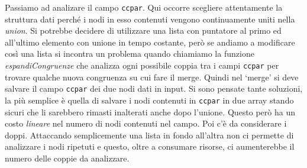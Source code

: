\documentclass[a4paper,11pt]{article} %
\newcommand{\campo}{\texttt}
\begin{document}
Passiamo ad analizare il campo \campo{ccpar}. 
Qui occorre scegliere attentamente la struttura dati perch\'e i nodi in esso contenuti
vengono continuamente uniti nella \emph{union}. %
Si potrebbe decidere
di utilizzare una lista con puntatore al primo ed all'ultimo elemento %
con unione in tempo costante, per\`o se andiamo a modificare cos\`i una lista
si incontra un problema quando chiamiamo la funzione \emph{espandiCongruenze} 
che analizza ogni possibile coppia tra i campi \campo{ccpar} per trovare qualche 
nuova congruenza su cui fare il merge. %
%
Quindi nel `merge' si deve salvare il campo \campo{ccpar} dei due nodi dati in input.
Si sono pensate tante soluzioni, la pi\`u semplice \`e quella di salvare i nodi
contenuti in \campo{ccpar} in due array stando sicuri che li sarebbero rimasti inalterati
anche dopo l'unione. Questo per\`o ha un costo \emph{lineare} nel numero di nodi contenuti
nel campo.
Poi c'\`e da considerare i doppi. Attaccando semplicemente una lista in fondo all'altra
non ci permette di analizzare i nodi ripetuti e questo, oltre a consumare risorse,
ci aumenterebbe il numero delle coppie da analizzare.
\end{document}
